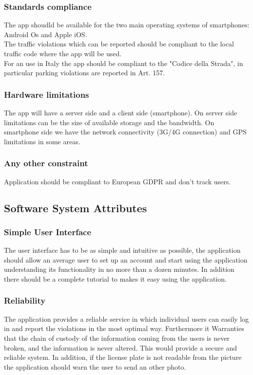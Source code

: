 \subsubsection{Standards compliance}
The app shoudld be available for the two main operating systems of smartphones: Android Os and Apple iOS.\\
The traffic violations which can be reported should be compliant to the local traffic code where the app will be used.\\
For an use in Italy the app should be compliant to the "Codice della Strada", in particular parking violations are reported in Art. 157.\\


\subsubsection{Hardware limitations}
The app will have a server side and a client side (smartphone).
On server side limitations can be the size of available storage and the bandwidth.
On smartphone side we have the network connectivity (3G/4G connection) and GPS limitations in some areas.

\subsubsection{Any other constraint}
Application should be compliant to European GDPR and don't track users.

\subsection{Software System Attributes} %
\subsubsection{Simple User Interface}
The user interface has to be as simple and intuitive as possible, the application should allow an average user to set up an account and start using the application understanding its functionality in no more than a dozen minutes. In addition there should be a complete tutorial to makes it easy using the application.

\subsubsection{Reliability}
The application provides a reliable service in which individual users can easily log in and report the violations in the most optimal way. Furthermore it Warranties that the chain of custody of the information coming from the users is never broken, and the information is never altered. This would provide a secure and reliable system. In addition, if the license plate	is not readable from the picture the application should warn the user to send an other photo.
